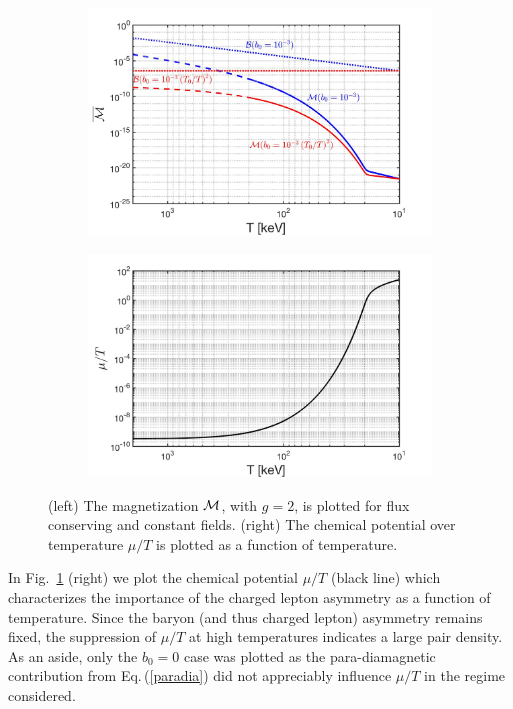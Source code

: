 \documentclass[a4paper]{article}
\newcommand{\req}[1]{Eq.\,(\ref{#1})}
\newcommand{\rf}[1]{Fig.~{\ref{#1}}}
\begin{document}
\begin{figure}[ht]
    \centering
    \begin{subfigure}{0.49\textwidth}
        \includegraphics[width=\textwidth]{Magnetization_Hc_constant.jpg}
    \end{subfigure}
    \hfill
    \begin{subfigure}{0.49\textwidth}
        \includegraphics[width=\textwidth]{ChemicalPotential_new.jpg}
    \end{subfigure}
    \caption{(left) The magnetization ${\cal M}$, with $g=2$, is plotted for flux conserving and constant fields. (right) The chemical potential over temperature $\mu/T$ is plotted as a function of temperature.}
    \label{fig:paireffect}
\end{figure}
 
In \rf{fig:paireffect} (right) we plot the chemical potential $\mu/T$ (black line) which characterizes the importance of the charged lepton asymmetry as a function of temperature. Since the baryon (and thus charged lepton) asymmetry remains fixed, the suppression of $\mu/T$ at high temperatures indicates a large pair density. As an aside, only the $b_{0}=0$ case was plotted as the para-diamagnetic contribution from \req{paradia} did not appreciably influence $\mu/T$ in the regime considered.
\end{document}
